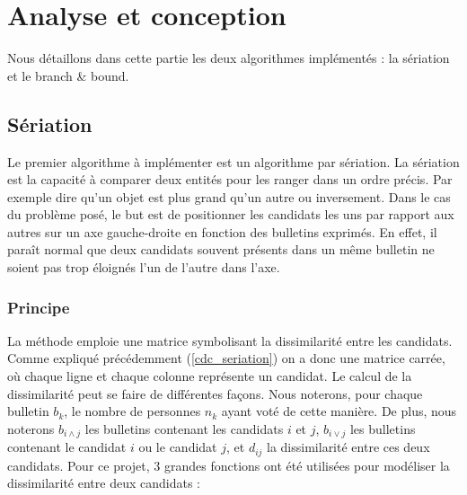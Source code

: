 \documentclass[11pt, a4paper]{article}
\begin{document}
\section{Analyse et conception}
Nous détaillons dans cette partie les deux algorithmes implémentés : la sériation et le branch \& bound.

\subsection{S\'{e}riation}

Le premier algorithme \`{a} impl\'{e}menter est un algorithme par s\'{e}riation. La s\'{e}riation est la capacit\'{e} \`{a} comparer deux entit\'{e}s pour les ranger dans un ordre pr\'{e}cis. Par exemple dire qu'un objet est plus grand qu'un autre ou inversement. Dans le cas du probl\`{e}me pos\'{e}, le but est de positionner les candidats les uns par rapport aux autres sur un axe gauche-droite en fonction des bulletins exprim\'{e}s. En effet, il para\^{i}t normal que deux candidats souvent pr\'{e}sents dans un m\^{e}me bulletin ne soient pas trop \'{e}loign\'{e}s l'un de l'autre dans l'axe.

\subsubsection{Principe}

La m\'{e}thode emploie une matrice symbolisant la dissimilarit\'{e} entre les candidats. Comme expliqué précédemment (\ref{cdc_seriation}) on a donc une matrice carr\'{e}e, o\`{u} chaque ligne et chaque colonne repr\'{e}sente un candidat. Le calcul de la dissimilarit\'{e} peut se faire de diff\'{e}rentes façons. Nous noterons, pour chaque bulletin $b_k$, le nombre de personnes $n_k$ ayant voté de cette manière. De plus, nous noterons $b_{i \wedge j}$ les bulletins contenant les candidats $i$ et $j$, $b_{i \vee j}$ les bulletins contenant le candidat $i$ ou le candidat $j$, et $d_{ij}$ la dissimilarité entre ces deux candidats. Pour ce projet, 3 grandes fonctions ont \'{e}t\'{e} utilis\'{e}es pour mod\'{e}liser la dissimilarit\'{e} entre deux candidats :
\end{document}
